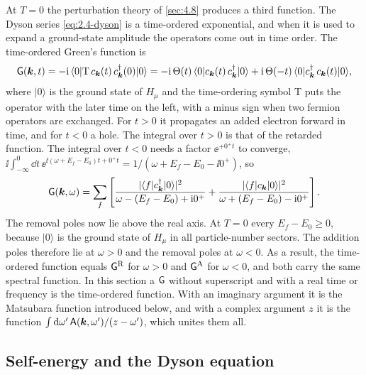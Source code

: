At $T = 0$ the perturbation theory of \cref{sec:4.8} produces a third function. The Dyson series \cref{eq:2.4-dyson} is a time-ordered exponential, and when it is used to expand a ground-state amplitude the operators come out in time order. The time-ordered Green's function is
\begin{equation}
  \mathsf{G}(\bm{k},t) = -\mathrm{i}\,\langle0|\mathrm{T}\,c_{\bm{k}}(t)\,c^\dagger_{\bm{k}}(0)|0\rangle
  = -\mathrm{i}\,\Theta(t)\,\langle0|c_{\bm{k}}(t)\,c^\dagger_{\bm{k}}|0\rangle + \mathrm{i}\,\Theta(-t)\,\langle0|c^\dagger_{\bm{k}}\,c_{\bm{k}}(t)|0\rangle ,
  \label{eq:4.7-GT}
\end{equation}
where $|0\rangle$ is the ground state of $H_\mu$ and the time-ordering symbol $\mathrm{T}$ puts the operator with the later time on the left, with a minus sign when two fermion operators are exchanged. For $t > 0$ it propagates an added electron forward in time, and for $t < 0$ a hole. The integral over $t > 0$ is that of the retarded function. The integral over $t < 0$ needs a factor $\ee^{+0^+t}$ to converge, $\ii\int_{-\infty}^0\dd t\,\ee^{\ii(\omega + E_f - E_0)t + 0^+t} = 1/(\omega + E_f - E_0 - \ii0^+)$, so
\begin{equation}
  \mathsf{G}(\bm{k},\omega) = \sum_f\left[\frac{|\langle f|c^\dagger_{\bm{k}}|0\rangle|^2}{\omega - (E_f - E_0) + \mathrm{i}0^+} + \frac{|\langle f|c_{\bm{k}}|0\rangle|^2}{\omega + (E_f - E_0) - \mathrm{i}0^+}\right] .
  \label{eq:4.7-GTlehmann}
\end{equation}
The removal poles now lie above the real axis. At $T = 0$ every $E_f - E_0 \ge 0$, because $|0\rangle$ is the ground state of $H_\mu$ in all particle-number sectors. The addition poles therefore lie at $\omega > 0$ and the removal poles at $\omega < 0$. As a result, the time-ordered function equals $\mathsf{G}^{\mathrm{R}}$ for $\omega > 0$ and $\mathsf{G}^{\mathrm{A}}$ for $\omega < 0$, and both carry the same spectral function. In this section a $\mathsf{G}$ without superscript and with a real time or frequency is the time-ordered function. With an imaginary argument it is the Matsubara function introduced below, and with a complex argument $z$ it is the function $\int\mathrm{d}\omega'\,\mathsf{A}(\bm{k},\omega')/(z - \omega')$, which unites them all.

\subsection{Self-energy and the Dyson equation}

